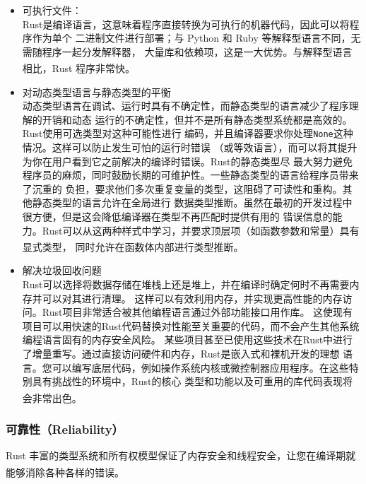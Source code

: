 \documentclass[UTF8,fontset=none,linespread=1.15]{ctexart}
\let\nosupcite\cite
\renewcommand*{\cite}[1]{\textsuperscript{\nosupcite{#1}}}
\begin{document}
\begin{itemize}
\item 可执行文件：\\
  Rust是编译语言，这意味着程序直接转换为可执行的机器代码，因此可以将程序作为单个
  二进制文件进行部署；与 Python 和 Ruby 等解释型语言不同，无需随程序一起分发解释器，
  大量库和依赖项，这是一大优势。与解释型语言相比，Rust 程序非常快。\cite{bib:4-rust-go-cmp}

\item 对动态类型语言与静态类型的平衡\\
  动态类型语言在调试、运行时具有不确定性，而静态类型的语言减少了程序理解的开销和动态
  运行的不确定性，但并不是所有静态类型系统都是高效的。Rust使用可选类型对这种可能性进行
  编码，并且编译器要求你处理\texttt{None}这种情况。这样可以防止发生可怕的运行时错误
  （或等效语言），而可以将其提升为你在用户看到它之前解决的编译时错误。Rust的静态类型尽
  最大努力避免程序员的麻烦，同时鼓励长期的可维护性。一些静态类型的语言给程序员带来了沉重的
  负担，要求他们多次重复变量的类型，这阻碍了可读性和重构。其他静态类型的语言允许在全局进行
  数据类型推断。虽然在最初的开发过程中很方便，但是这会降低编译器在类型不再匹配时提供有用的
  错误信息的能力。Rust可以从这两种样式中学习，并要求顶层项（如函数参数和常量）具有显式类型，
  同时允许在函数体内部进行类型推断。\cite{bib:3-why-rust-pop}

\item 解决垃圾回收问题\\
  Rust可以选择将数据存储在堆栈上还是堆上，并在编译时确定何时不再需要内存并可以对其进行清理。
  这样可以有效利用内存，并实现更高性能的内存访问。Rust项目非常适合被其他编程语言通过外部功能接口用作库。
  这使现有项目可以用快速的Rust代码替换对性能至关重要的代码，而不会产生其他系统编程语言固有的内存安全风险。
  某些项目甚至已使用这些技术在Rust中进行了增量重写。通过直接访问硬件和内存，Rust是嵌入式和裸机开发的理想
  语言。您可以编写底层代码，例如操作系统内核或微控制器应用程序。在这些特别具有挑战性的环境中，Rust的核心
  类型和功能以及可重用的库代码表现将会非常出色。\cite{bib:3-why-rust-pop}
\end{itemize}

\subsubsection{可靠性（Reliability）}

Rust 丰富的类型系统和所有权模型保证了内存安全和线程安全，让您在编译期就能够消除各种各样的错误。\cite{bib:1-rust-lang}
\end{document}

